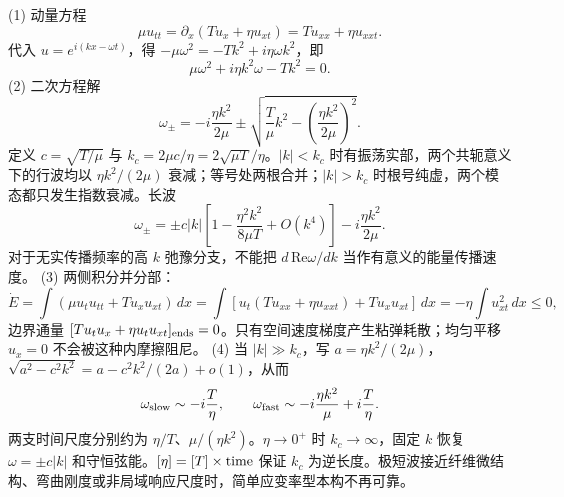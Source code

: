 (1) 动量方程
\[
\mu u_{tt}=\partial_x(Tu_x+\eta u_{xt})=Tu_{xx}+\eta u_{xxt}.
\]
代入 \(u=e^{i(kx-\omega t)}\)，得
\(-\mu\omega^2=-Tk^2+i\eta\omega k^2\)，即
\[
\mu\omega^2+i\eta k^2\omega-Tk^2=0.
\]
(2) 二次方程解
\[
\omega_\pm=-i\frac{\eta k^2}{2\mu}
\pm\sqrt{\frac{T}{\mu}k^2-\left(\frac{\eta k^2}{2\mu}\right)^2}.
\]
定义 \(c=\sqrt{T/\mu}\) 与 \(k_c=2\mu c/\eta=2\sqrt{\mu T}/\eta\)。\(|k|<k_c\) 时有振荡实部，两个共轭意义下的行波均以 \(\eta k^2/(2\mu)\) 衰减；等号处两根合并；\(|k|>k_c\) 时根号纯虚，两个模态都只发生指数衰减。长波
\[
\omega_\pm=\pm c|k|\left[1-\frac{\eta^2 k^2}{8\mu T}+O(k^4)\right]
-i\frac{\eta k^2}{2\mu}.
\]
对于无实传播频率的高 \(k\) 弛豫分支，不能把 \(d\,\mathrm{Re}\omega/dk\) 当作有意义的能量传播速度。
(3) 两侧积分并分部：
\[
\dot E=\int(\mu u_tu_{tt}+Tu_xu_{xt})\,dx
=\int[u_t(Tu_{xx}+\eta u_{xxt})+Tu_xu_{xt}]\,dx
=-\eta\int u_{xt}^2\,dx\le0,
\]
边界通量 \([Tu_tu_x+\eta u_tu_{xt}]_{\rm ends}=0\)。只有空间速度梯度产生粘弹耗散；均匀平移 \(u_x=0\) 不会被这种内摩擦阻尼。
(4) 当 \(|k|\gg k_c\)，写 \(a=\eta k^2/(2\mu)\)，\(\sqrt{a^2-c^2k^2}=a-c^2k^2/(2a)+o(1)\)，从而
\[
\omega_{\rm slow}\sim-i\frac{T}{\eta},\qquad
\omega_{\rm fast}\sim-i\frac{\eta k^2}{\mu}
+i\frac T\eta.
\]
两支时间尺度分别约为 \(\eta/T\)、\(\mu/(\eta k^2)\)。\(\eta\to0^+\) 时 \(k_c\to\infty\)，固定 \(k\) 恢复 \(\omega=\pm c|k|\) 和守恒弦能。\([\eta]=[T]\times{\rm time}\) 保证 \(k_c\) 为逆长度。极短波接近纤维微结构、弯曲刚度或非局域响应尺度时，简单应变率型本构不再可靠。
